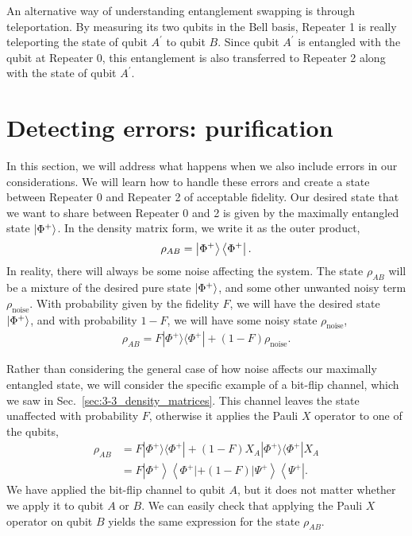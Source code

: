 An alternative way of understanding entanglement swapping is through teleportation.
By measuring its two qubits in the Bell basis, Repeater 1 is really teleporting the state of qubit $A^{\prime}$ to qubit $B$.
Since qubit $A^{\prime}$ is entangled with the qubit at Repeater 0, this entanglement is also transferred to Repeater 2 along with the state of qubit $A^{\prime}$.



\section{Detecting errors: purification}
\label{sec:12-4_purification}

In this section, we will address what happens when we also include errors in our considerations.
We will learn how to  handle these errors and create a state between Repeater 0 and Repeater 2 of acceptable fidelity.
Our desired state that we want to share between Repeater 0 and 2 is given by the maximally entangled state $\left| \Phi^+ \right\rangle$.
In the density matrix form, we write it as the outer product,
\begin{align}
    \rho_{AB} = \left| \Phi^{+} \right\rangle\left\langle \Phi^{+} \right|.
\end{align}
In reality, there will always be some noise affecting the system.
The state $\rho_{AB}$ will be a mixture of the desired pure state $\left| \Phi^+ \right\rangle$, and some other unwanted noisy term $\rho_{\text{noise}}$.
With probability given by the fidelity $F$, we will have the desired state $\left| \Phi^+ \right\rangle$, and with probability $1-F$, we will have some noisy state $\rho_{\text{noise}}$,
\begin{align}
    \rho_{AB} = F |\Phi^{+}\rangle\langle\Phi^{+}|+(1-F)\rho_{\text{noise}}.
\end{align}

Rather than considering the general case of how noise affects our maximally entangled state, we will consider the specific example of a bit-flip channel, which we saw in Sec.~\ref{sec:3-3_density_matrices}.
This channel leaves the state unaffected with probability $F$, otherwise it applies the Pauli $X$ operator to one of the qubits,
\begin{align}
    \rho_{AB} & = F|\Phi^{+}\rangle\langle\Phi^{+}|+(1-F) X_A| \Phi^{+}\rangle\langle\Phi^{+}| X_A \nonumber\\
    & = F \left|\Phi^{+}\right\rangle\left\langle\Phi^{+}|+(1-F)| \Psi^{+}\right\rangle\left\langle\Psi^{+}\right|.
    \label{eq:12-4_bitflip_mixed_state}
\end{align}
We have applied the bit-flip channel to qubit $A$, but it does not matter whether we apply it to qubit $A$ or $B$.
We can easily check that applying the Pauli $X$ operator on qubit $B$ yields the same expression for the state $\rho_{AB}$.

